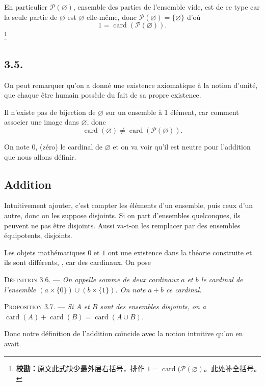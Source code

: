 En particulier $\mathcal P(\varnothing)$, ensemble des parties de l'ensemble vide, est de ce type car la seule partie de $\varnothing$ est $\varnothing$ elle-même, donc $\mathcal P(\varnothing)=\{\varnothing\}$ d'où
\[
1=\operatorname{card}(\mathcal P(\varnothing)).
\]
\footnote{\textbf{校勘：}原文此式缺少最外层右括号，排作 $1=\operatorname{card}(\mathcal P(\varnothing)$。此处补全括号。}

\subsection*{3.5.}
On peut remarquer qu'on a donné une existence axiomatique à la notion d'unité, que chaque être humain possède du fait de sa propre existence.

Il n'existe pas de bijection de $\varnothing$ sur un ensemble à 1 élément, car comment associer une image dans $\varnothing$, donc
\[
\operatorname{card}(\varnothing)\ne\operatorname{card}(\mathcal P(\varnothing)).
\]

On note $0$, (zéro) le cardinal de $\varnothing$ et on va voir qu'il est neutre pour l'addition que nous allons définir.


\subsection*{Addition}
Intuitivement ajouter, c'est compter les éléments d'un ensemble, puis ceux d'un autre, donc on les suppose disjoints. Si on part d'ensembles quelconques, ils peuvent ne pas être disjoints. Aussi va-t-on les remplacer par des ensembles équipotents, disjoints.

Les objets mathématiques $0$ et $1$ ont une existence dans la théorie construite et ils sont différents, , car des cardinaux. On pose

\medskip\noindent\textsc{Définition 3.6.} --- \emph{On appelle somme de deux cardinaux $a$ et $b$ le cardinal de l'ensemble $(a\times\{0\})\cup(b\times\{1\})$. On note $a+b$ ce cardinal.}

\medskip\noindent\textsc{Proposition 3.7.} --- \emph{Si $A$ et $B$ sont des ensembles disjoints, on a $\operatorname{card}(A)+\operatorname{card}(B)=\operatorname{card}(A\cup B)$.}

Donc notre définition de l'addition coïncide avec la notion intuitive qu'on en avait.

